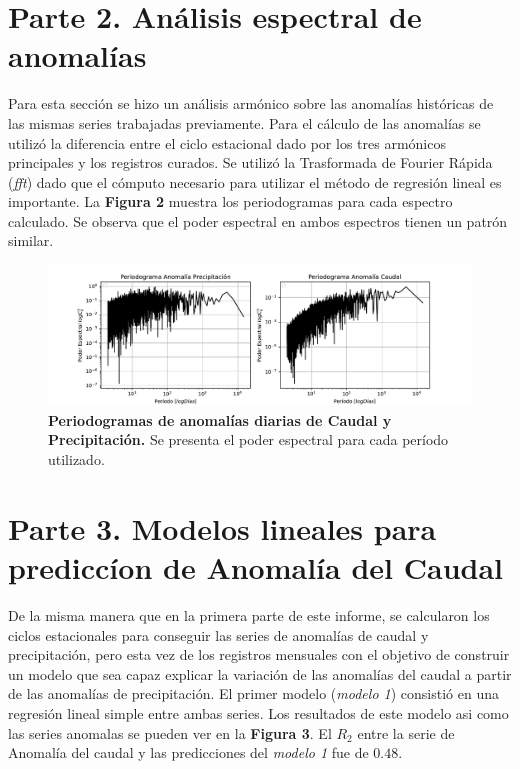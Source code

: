 \newpage

\section*{Parte 2. Análisis espectral de anomalías}

\bigskip

Para esta sección se hizo un análisis armónico sobre las anomalías históricas de las mismas series trabajadas previamente. Para el cálculo de las anomalías se utilizó la diferencia entre el ciclo estacional dado por los tres armónicos principales y los registros curados. Se utilizó la Trasformada de Fourier Rápida (\textit{fft}) dado que el cómputo necesario para utilizar el método de regresión lineal es importante. La \textbf{Figura 2} muestra los periodogramas para cada espectro calculado. Se observa que el poder espectral en ambos espectros tienen un patrón similar.

\bigskip


\begin{figure}[htp!]
\centering
\includegraphics[width=1\textwidth]{img/spectral.pdf} 
\caption{\textbf{Periodogramas de anomalías diarias de Caudal y Precipitación.} Se presenta el poder espectral para cada período utilizado.}
\label{fig:5}
\end{figure}
\bigskip

\newpage

\bigskip

\section*{Parte 3. Modelos lineales para prediccíon de Anomalía del Caudal}

\bigskip

De la misma manera que en la primera parte de este informe, se calcularon los ciclos estacionales para conseguir las series de anomalías de caudal y precipitación, pero esta vez de los registros mensuales con el objetivo de construir un modelo que sea capaz explicar la variación de las anomalías del caudal a partir de las anomalías de precipitación. El primer modelo (\textit{modelo 1}) consistió en una regresión lineal simple entre ambas series. Los resultados de este modelo asi como las series anomalas se pueden ver en la \textbf{Figura 3}. El $R_{2}$ entre la serie de Anomalía del caudal y las predicciones del \textit{modelo 1} fue de $0.48$.


